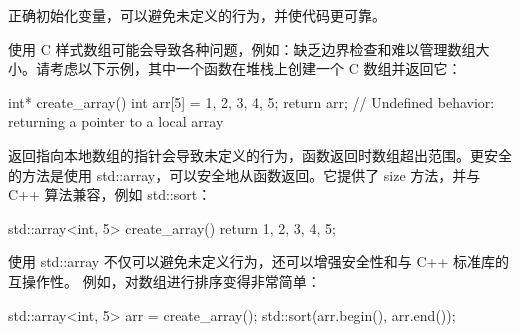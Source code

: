 正确初始化变量，可以避免未定义的行为，并使代码更可靠。


使用 C 样式数组可能会导致各种问题，例如：缺乏边界检查和难以管理数组大小。请考虑以下示例，其中一个函数在堆栈上创建一个 C 数组并返回它：

\begin{cpp}
int* create_array() {
    int arr[5] = {1, 2, 3, 4, 5};
    return arr; // Undefined behavior: returning a pointer to a local array
}
\end{cpp}

返回指向本地数组的指针会导致未定义的行为，函数返回时数组超出范围。更安全的方法是使用 std::array，可以安全地从函数返回。它提供了 size 方法，并与 C++ 算法兼容，例如 std::sort：

\begin{cpp}
std::array<int, 5> create_array() {
    return {1, 2, 3, 4, 5};
}
\end{cpp}

使用 std::array 不仅可以避免未定义行为，还可以增强安全性和与 C++ 标准库的互操作性。
例如，对数组进行排序变得非常简单：

\begin{cpp}
std::array<int, 5> arr = create_array();
std::sort(arr.begin(), arr.end());
\end{cpp}
